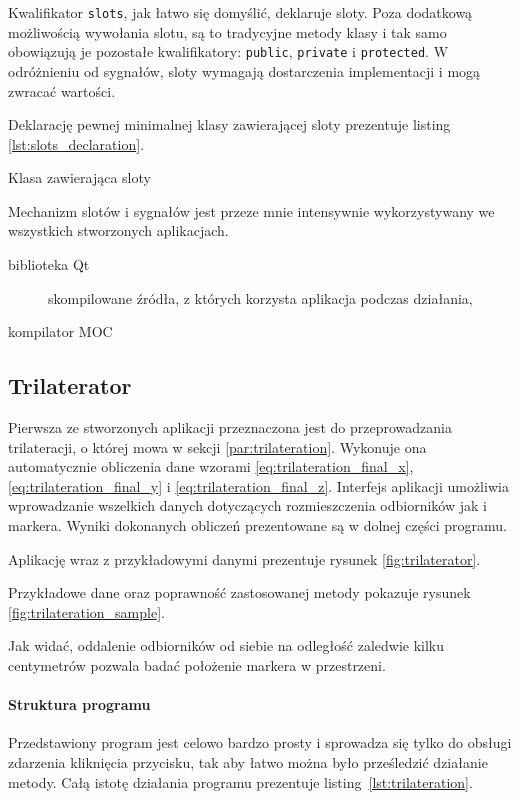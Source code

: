 Kwalifikator \verb|slots|, jak łatwo się domyślić, deklaruje sloty. Poza dodatkową możliwością wywołania slotu, są to tradycyjne metody klasy i tak samo obowiązują je pozostałe kwalifikatory: \verb|public|, \verb|private| i \verb|protected|. W odróżnieniu od sygnałów, sloty wymagają dostarczenia implementacji i mogą zwracać wartości.

Deklarację pewnej minimalnej klasy zawierającej sloty prezentuje listing \ref{lst:slots_declaration}.

\begin{listing}
  
  \caption{Klasa zawierająca sloty}
  \label{lst:slots_declaration}
\end{listing}

Mechanizm slotów i sygnałów jest przeze mnie intensywnie wykorzystywany we wszystkich stworzonych aplikacjach.

\begin{description}
 \item[biblioteka Qt] skompilowane źródła, z których korzysta aplikacja podczas działania,
 \item[kompilator MOC] 
\end{description}


\subsection{Trilaterator}
Pierwsza ze stworzonych aplikacji przeznaczona jest do przeprowadzania trilateracji, o której mowa w sekcji \ref{par:trilateration}. Wykonuje ona automatycznie obliczenia dane wzorami \ref{eq:trilateration_final_x}, \ref{eq:trilateration_final_y} i \ref{eq:trilateration_final_z}. Interfejs aplikacji umożliwia wprowadzanie wszelkich danych dotyczących rozmieszczenia odbiorników jak i markera. Wyniki dokonanych obliczeń prezentowane są w dolnej części programu.

Aplikację wraz z przykładowymi danymi prezentuje rysunek \ref{fig:trilaterator}.

Przykładowe dane oraz poprawność zastosowanej metody pokazuje rysunek \ref{fig:trilateration_sample}.

Jak widać, oddalenie odbiorników od siebie na odległość zaledwie kilku centymetrów pozwala badać położenie markera w przestrzeni.

\paragraph{Struktura programu}
Przedstawiony program jest celowo bardzo prosty i sprowadza się tylko do obsługi zdarzenia kliknięcia przycisku, tak aby łatwo można było prześledzić działanie metody. Całą istotę działania programu prezentuje listing~\ref{lst:trilateration}.

